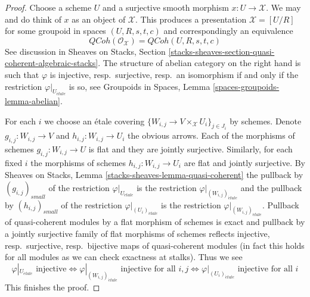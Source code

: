 \documentclass[10pt,a4paper]{amsart}
\theoremstyle{plain}
\theoremstyle{definition}
\theoremstyle{remark}
\numberwithin{equation}{subsection}
\def\etale{{\acute{e}tale}}
\def\QCoh{\mathit{QCoh}}
\begin{document}
\begin{proof}
Choose a scheme $U$ and a surjective smooth morphism
$x : U \to \mathcal{X}$. We may and do think of $x$
as an object of $\mathcal{X}$.
This produces a presentation $\mathcal{X} = [U/R]$ for some groupoid
in spaces $(U, R, s, t, c)$ and correspondingly an equivalence
$$
\QCoh(\mathcal{O}_\mathcal{X}) = \QCoh(U, R, s, t, c)
$$
See discussion in Sheaves on Stacks, Section
\ref{stacks-sheaves-section-quasi-coherent-algebraic-stacks}.
The structure of abelian category on the right hand is such that $\varphi$
is injective, resp.\ surjective, resp.\ an isomorphism
if and only if the restriction $\varphi|_{U_\etale}$ is so, see
Groupoids in Spaces, Lemma \ref{spaces-groupoids-lemma-abelian}.

\medskip\noindent
For each $i$ we choose an \'etale covering
$\{W_{i, j} \to V \times_\mathcal{X} U_i\}_{j \in J_i}$
by schemes. Denote $g_{i, j} : W_{i, j} \to V$ and
$h_{i, j} : W_{i, j} \to U_i$ the obvious arrows.
Each of the morphisms of schemes $g_{i, j} : W_{i, j} \to U$ is flat
and they are jointly surjective.
Similarly, for each fixed $i$ the morphisms of schemes
$h_{i, j} : W_{i, j} \to U_i$ are flat and jointly surjective.
By Sheaves on Stacks, Lemma \ref{stacks-sheaves-lemma-quasi-coherent}
the pullback by $(g_{i, j})_{small}$ of the restriction
$\varphi|_{U_\etale}$ is the restriction $\varphi|_{(W_{i, j})_\etale}$
and the pullback by $(h_{i, j})_{small}$ of the restriction
$\varphi|_{(U_i)_\etale}$ is the restriction $\varphi|_{(W_{i, j})_\etale}$.
Pullback of quasi-coherent modules by a flat morphism of schemes is exact
and pullback by a jointly surjective family of flat morphisms of schemes
reflects injective, resp.\ surjective, resp.\ bijective maps
of quasi-coherent modules (in fact this holds for all modules
as we can check exactness at stalks). Thus we see
$$
\varphi|_{U_\etale} \text{ injective}
\Leftrightarrow
\varphi|_{(W_{i, j})_\etale} \text{ injective for all }i, j
\Leftrightarrow
\varphi|_{(U_i)_\etale} \text{ injective for all }i
$$
This finishes the proof.
\end{proof}
\end{document}
